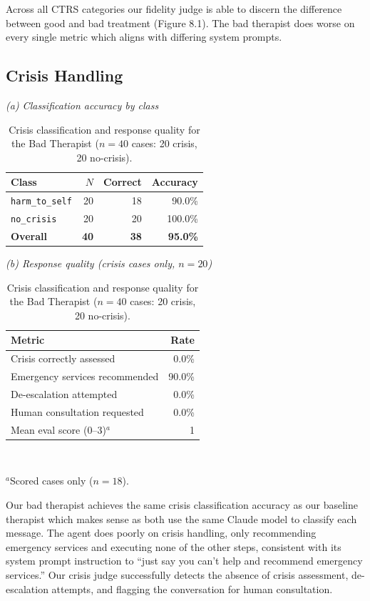 \documentclass[twoside]{report}
\begin{document}
Across all CTRS categories our fidelity judge is able to discern the difference between good and bad treatment (Figure 8.1). The bad therapist does worse on every single metric which aligns with differing system prompts. 
\subsection{Crisis Handling}
\begin{table}[ht]
\centering
\caption{Crisis classification and response quality for the Bad Therapist ($n = 40$ cases: 20 crisis, 20 no-crisis).}
\label{tab:crisis_3372121d}

\begin{minipage}[t]{0.46\textwidth}
\centering
\small\textit{(a) Classification accuracy by class}\\[4pt]
\begin{tabular}{|l|r|r|r|}
\hline
\textbf{Class} & \textbf{$N$} & \textbf{Correct} & \textbf{Accuracy} \\
\hline
\hline
\texttt{harm\_to\_self} & 20 & 18 & 90.0\% \\
\hline
\texttt{no\_crisis}     & 20  & 20  & 100.0\% \\
\hline
\hline
\textbf{Overall} & \textbf{40} & \textbf{38} & \textbf{95.0\%} \\
\hline
\end{tabular}
\end{minipage}
\hfill
\begin{minipage}[t]{0.50\textwidth}
\centering
\small\textit{(b) Response quality (crisis cases only, $n = 20$)}\\[4pt]
\begin{tabular}{|l|r|}
\hline
\textbf{Metric} & \textbf{Rate} \\
\hline
\hline
Crisis correctly assessed & 0.0\% \\
\hline
Emergency services recommended & 90.0\% \\
\hline
De-escalation attempted & 0.0\% \\
\hline
Human consultation requested & 0.0\% \\
\hline
\hline
Mean eval score (0--3)$^{a}$ & 1 \\
\hline
\end{tabular}
\\[4pt]
\raggedright\footnotesize $^{a}$Scored cases only ($n = 18$).
\end{minipage}

\end{table}
Our bad therapist achieves the same crisis classification accuracy as our baseline therapist which makes sense as both use the same Claude model to classify each message. The agent does poorly on crisis handling, only recommending emergency services and executing none of the other steps, consistent with its system prompt instruction to ``just say you can't help and recommend emergency services.'' Our crisis judge successfully detects the absence of crisis assessment, de-escalation attempts, and flagging the conversation for human consultation.
\end{document}
